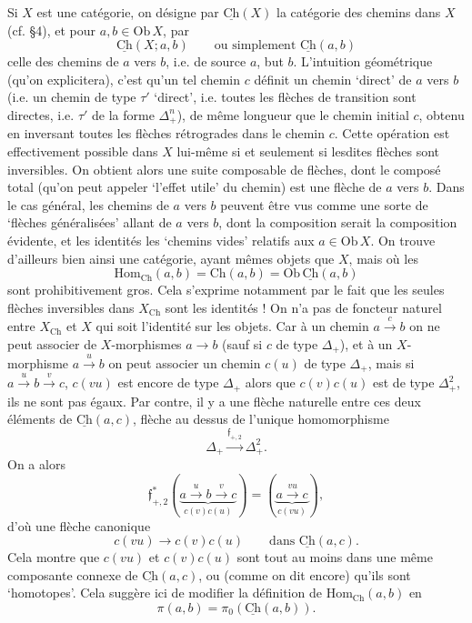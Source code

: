 \documentclass[11pt]{article}
\newcommand{\msp}[1]{\marginpar{\footnotesize [#1]}}
\newcommand{\Ch}{\underline{\mathrm{Ch}}}
\begin{document}
Si $X$ est une catégorie, on désigne par $\Ch(X)$ la catégorie des chemins dans $X$ (cf. §4), et pour $a,b \in \mathrm{Ob}\,X$, par
\[
\Ch(X;a,b) \qquad \text{ou simplement } \Ch(a,b)
\]
celle des chemins de $a$ vers $b$, i.e. de source $a$, but $b$. L'intuition géométrique (qu'on explicitera), c'est qu'un tel chemin $c$ définit un chemin `direct' de $a$ vers $b$ (i.e. un chemin de type $\tau'$ `direct', i.e. toutes les flèches de transition sont directes, i.e. $\tau'$ de la forme $\Delta_+^n$), de même longueur que le chemin initial $c$, obtenu en inversant toutes les flèches rétrogrades dans le chemin $c$. Cette opération est effectivement possible dans $X$ lui-même si et seulement si lesdites flèches sont inversibles. On obtient alors une suite composable de flèches, dont le composé total (qu'on peut appeler `l'effet utile' du chemin)
\msp{page 60}
est une flèche de $a$ vers $b$. Dans le cas général, les chemins de $a$ vers $b$ peuvent être vus comme une sorte de `flèches généralisées' allant de $a$ vers $b$, dont la composition serait la composition évidente, et les identités les `chemins vides' relatifs aux $a \in \mathrm{Ob}\,X$. On trouve d'ailleurs bien ainsi une catégorie, ayant mêmes objets que $X$, mais où les
\[
\mathrm{Hom}_{\mathrm{Ch}}(a,b) = \mathrm{Ch}(a,b) = \mathrm{Ob}\,\Ch(a,b)
\]
sont prohibitivement gros. Cela s'exprime notamment par le fait que les seules flèches inversibles dans $X_{\mathrm{Ch}}$ sont les identités ! On n'a pas de foncteur naturel entre $X_{\mathrm{Ch}}$ et $X$ qui soit l'identité sur les objets. Car à un chemin $a \xrightarrow{c} b$ on ne peut associer de $X$-morphismes $a \longrightarrow b$ (sauf si $c$ de type $\Delta_+$), et à un $X$-morphisme $a \xrightarrow{u} b$ on peut associer un chemin $c(u)$ de type $\Delta_+$, mais si $a \xrightarrow{u} b \xrightarrow{v} c$, $c(vu)$ est encore de type $\Delta_+$ alors que $c(v)c(u)$ est de type $\Delta_+^2$, ils ne sont pas égaux. Par contre, il y a une flèche naturelle entre ces deux éléments de $\Ch(a,c)$, flèche au dessus de l'unique homomorphisme
\[
\Delta_+ \xrightarrow{\mathfrak{f}_{+,2}} \Delta_+^2.
\]
\msp{page 61}
On a alors
\[
\mathfrak{f}_{+,2}^*(\underbrace{a \xrightarrow{u} b \xrightarrow{v} c}_{c(v)c(u)}) = (\underbrace{a \xrightarrow{vu} c}_{c(vu)}),
\]
d'où une flèche canonique
\[
c(vu) \longrightarrow c(v)c(u) \qquad \text{dans } \Ch(a,c).
\]
Cela montre que $c(vu)$ et $c(v)c(u)$ sont tout au moins dans une même composante connexe de $\Ch(a,c)$, ou (comme on dit encore) qu'ils sont `homotopes'. Cela suggère ici de modifier la définition de $\mathrm{Hom}_{\mathrm{Ch}}(a,b)$ en
\[
\pi(a,b) = \pi_0(\Ch(a,b)).
\]
\end{document}
